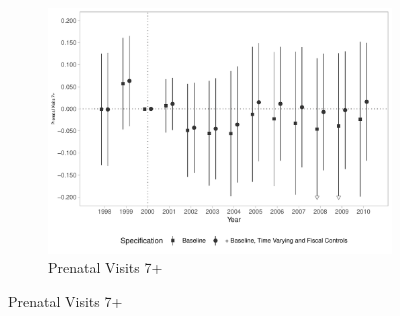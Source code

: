 \begin{figure}[h!]
\begin{center}
    \begin{subfigure}{0.32\textwidth}
        \centering
        \caption{\scriptsize Prenatal Visits 7+}\label{fig:14c}
        \includegraphics[width=\textwidth]{plots/birth_prenat_7_plus_dist_ec29_baseline_dist_ec29_baseline_14.pdf}
    \end{subfigure}
        
    
    \end{center}
    
\end{figure}